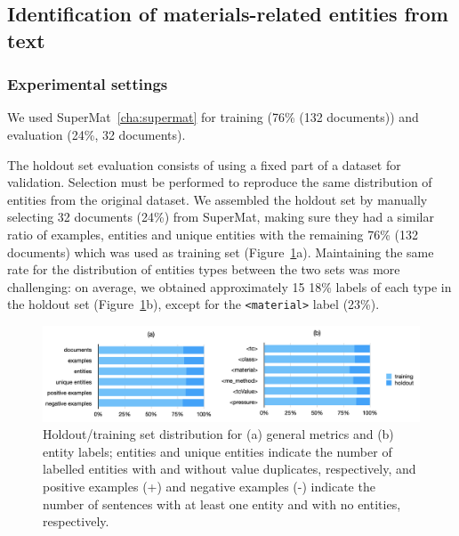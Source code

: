 \subsection{Identification of materials-related entities from text}
\subsubsection{Experimental settings}

We used SuperMat~\ref{cha:supermat} for training (76\% (132 documents)) and evaluation (24\%, 32 documents). 

The holdout set evaluation consists of using a fixed part of a dataset for validation. 
Selection must be performed to reproduce the same distribution of entities from the original dataset.
We assembled the holdout set by manually selecting 32 documents (24\%) from SuperMat, making sure they had a similar ratio of examples, entities and unique entities with the remaining 76\% (132 documents) which was used as training set (Figure~\ref{fig:training-holdout-set-distribution}a).
Maintaining the same rate for the distribution of entities types between the two sets was more challenging: on average, we obtained approximately 15 18\% labels of each type in the holdout set (Figure~\ref{fig:training-holdout-set-distribution}b), except for the \texttt{<material>} label (23\%). 

\begin{figure}[ht]
    \centering
    \includegraphics[width=\textwidth]{figures/automatic_extraction_supercon/superconductor-holdout-training-set}
    \caption{Holdout/training set distribution for (a) general metrics and (b) entity labels; entities and unique entities indicate the number of labelled entities with and without value duplicates, respectively, and positive examples (+) and negative examples (-) indicate the number of sentences with at least one entity and with no entities, respectively.}
    \label{fig:training-holdout-set-distribution}
\end{figure}

